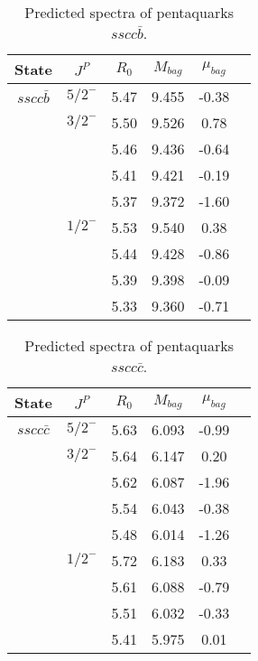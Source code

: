 \documentclass[prd,twocolumn,floatfix,nofootinbib]{revtex4}
\begin{document}
\begin{table*}[!htbp]
    \caption{Predicted spectra of pentaquarks $sscc\bar{b}$.}
    \begin{tabular}{cccccc}
        \hline\hline
        {\rm State} &$J^{P}$ &$R_{0}$ &$M_{bag}$ &$\mu_{bag}$  \\ \hline
        $sscc\bar{b}$
            &${5/2}^{-}$     &5.47   &9.455 &-0.38  \\                
            &${3/2}^{-}$     &5.50   &9.526 &0.78 \\
                         &$ $     &5.46   &9.436 &-0.64  \\
                         &$ $     &5.41   &9.421 &-0.19  \\
                         &$ $     &5.37   &9.372 &-1.60 \\
            &${1/2}^{-}$     &5.53   &9.540 &0.38  \\
                         &$ $     &5.44   &9.428 &-0.86  \\
                         &$ $     &5.39   &9.398 &-0.09  \\
                         &$ $     &5.33   &9.360 &-0.71 \\
       \hline\hline
    \end{tabular}
\end{table*}

\begin{table*}[!htbp]
    \caption{Predicted spectra of pentaquarks $sscc\bar{c}$.}
    \begin{tabular}{cccccc}
        \hline\hline
        {\rm State} &$J^{P}$ &$R_{0}$ &$M_{bag}$ &$\mu_{bag}$  \\ \hline
        $sscc\bar{c}$
            &${5/2}^{-}$     &5.63   &6.093 &-0.99  \\                
            &${3/2}^{-}$     &5.64   &6.147 &0.20 \\
                         &$ $     &5.62   &6.087 &-1.96  \\
                         &$ $     &5.54   &6.043 &-0.38  \\
                         &$ $     &5.48   &6.014 &-1.26 \\
            &${1/2}^{-}$     &5.72   &6.183 &0.33  \\
                         &$ $     &5.61   &6.088 &-0.79  \\
                         &$ $     &5.51   &6.032 &-0.33 \\
                         &$ $     &5.41   &5.975 &0.01 \\
       \hline\hline
    \end{tabular}
\end{table*}
\end{document}
